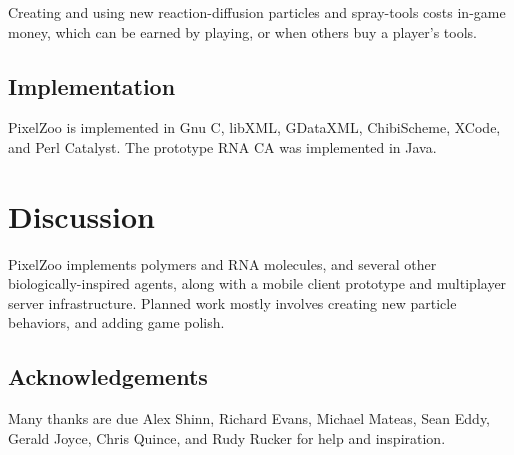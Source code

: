 \documentclass{acm_proc_article-sp}
\begin{document}
Creating and using new reaction-diffusion particles and spray-tools costs in-game money,
which can be earned by playing, or when others buy a player's tools.

\subsection{Implementation}

PixelZoo is implemented in Gnu C, libXML, GDataXML, ChibiScheme, XCode, and Perl Catalyst.
The prototype RNA CA was implemented in Java.

\section{Discussion}

PixelZoo implements polymers and RNA molecules,
and several other biologically-inspired agents, along with a mobile client prototype and multiplayer server infrastructure.
Planned work mostly involves creating new particle behaviors,
and adding game polish.

\subsection{Acknowledgements}

Many thanks are due Alex Shinn, Richard Evans, Michael Mateas, Sean Eddy, Gerald Joyce, Chris Quince,
and Rudy Rucker for help and inspiration.




\balancecolumns
\end{document}
